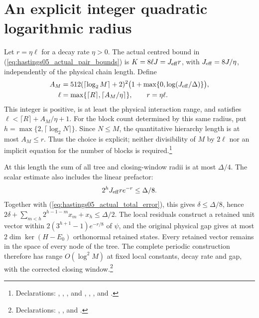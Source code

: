 \documentclass{article}
\begin{document}
\section{An explicit integer quadratic logarithmic radius}

Let $r=\eta\ell$ for a decay rate $\eta>0$. The actual centred bound in
(\ref{eq:hastings05_actual_pair_bounds}) is
$K=8\ell J=J_{\rm eff}r$, with $J_{\rm eff}=8J/\eta$, independently of the
physical chain length. Define
\begin{align}
 A_M&=512(\lceil\log_2M\rceil+2)^2
       \bigl(1+\max\{0,\log(J_{\rm eff}/\Delta)\}\bigr),\\
 \ell&=\max\{\lceil R\rceil,\lceil A_M/\eta\rceil\},\qquad r=\eta\ell.
 \label{eq:hastings05_integer_radius}
\end{align}
This integer is positive, is at least the physical interaction range, and
satisfies $\ell<\lceil R\rceil+A_M/\eta+1$.
For the block count determined by this same radius, put
$h=\max\{2,\lceil\log_2N\rceil\}$. Since $N\le M$, the quantitative
hierarchy length is at most $A_M\le r$. Thus the choice is explicit;
neither divisibility of $M$ by $2\ell$ nor an implicit equation for the
number of blocks is required.\footnote{Declarations:
,
,
, and
,
,
, and
.}

At this length the sum of all tree and closing-window radii is at most
$\Delta/4$. The scalar estimate also includes the linear prefactor:
\begin{align}
 2^hJ_{\rm eff}r e^{-r}\le\Delta/8.
 \label{eq:hastings05_linear_truncation_budget}
\end{align}
Together with (\ref{eq:hastings05_actual_total_error}), this gives
$\delta\le\Delta/8$, hence $2\delta+\sum_{m<h}2^{h-1-m}x_m+x_h\le\Delta/2$.
The local residuals construct a retained unit vector within
$2(3^{h+1}-1)e^{-r/8}$ of $\psi$, and the original physical gap gives
at most $2\dim\ker(H-E_0)$ orthonormal retained states.
Every retained vector remains in the space of every node of the tree.
The complete periodic construction therefore has range $O(\log^2M)$
at fixed local constants, decay rate and gap, with the corrected closing
window.\footnote{Declarations:
,
, and
.}
\end{document}
